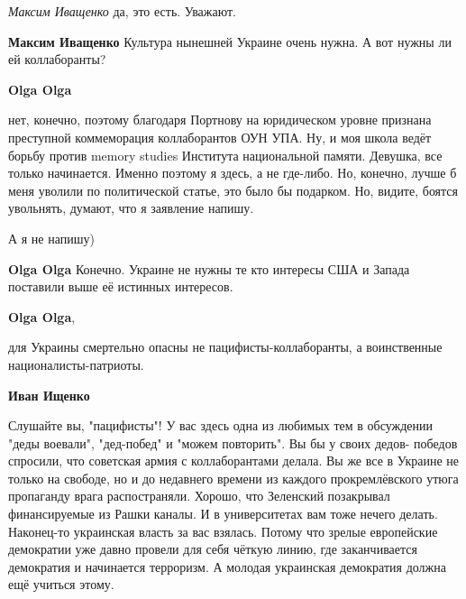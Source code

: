 \begin{itemize}
\begin{itemize}
\emph{Максим Иващенко} да, это есть. Уважают.

 
\textbf{Максим Иващенко} Культура нынешней Украине очень нужна. А вот нужны ли ей коллаборанты?

 
\textbf{Olga Olga} 

нет, конечно, поэтому благодаря Портнову на юридическом уровне признана
преступной коммеморация коллаборантов ОУН УПА. Ну, и моя школа ведёт борьбу
против memory studies Института национальной памяти. Девушка, все только
начинается. Именно поэтому я здесь, а не где-либо. Но, конечно, лучше б меня
уволили по политической статье, это было бы подарком. Но, видите, боятся
увольнять, думают, что я заявление напишу.

А я не напишу)

 
\textbf{Olga Olga} Конечно. Украине не нужны те кто интересы США и Запада поставили выше её истинных интересов.

 
\textbf{Olga Olga},

для Украины смертельно опасны не пацифисты-коллаборанты, а воинственные националисты-патриоты.

 
\textbf{Иван Ищенко} 

Слушайте вы, "пацифисты"! У вас здесь одна из любимых тем в обсуждении "деды
воевали", "дед-побед" и "можем повторить". Вы бы у своих дедов- победов
спросили, что советская армия с коллаборантами делала. Вы же все в Украине не
только на свободе, но и до недавнего времени из каждого прокремлёвского утюга
пропаганду врага распостраняли. Хорошо, что Зеленский позакрывал финансируемые
из Рашки каналы. И в университетах вам тоже нечего делать. Наконец-то
украинская власть за вас взялась. Потому что зрелые европейские демократии уже
давно провели для себя чёткую линию, где заканчивается демократия и начинается
терроризм. А молодая украинская демократия должна ещё учиться этому.


\end{itemize}
\end{itemize}
